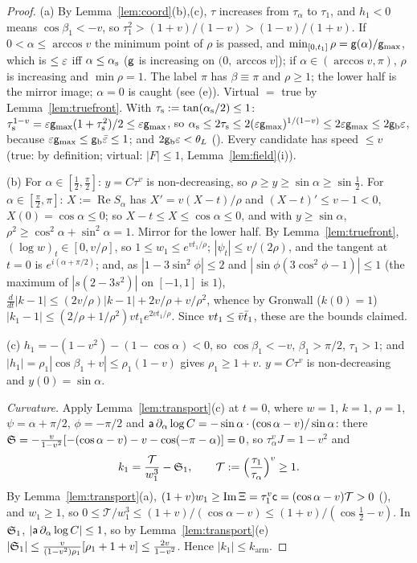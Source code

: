 \begin{proof}
(a) By Lemma~\ref{lem:coord}(b),(c), $\tau$ increases from $\tau_\alpha$ to $\tau_1$, and $h_1<0$ means $\cos\beta_1<-v$, so
$\tau_1^2>(1+v)/(1-v)>(1-v)/(1+v)$. If $0<\alpha\le\arccos v$ the minimum point of $\rho$ is passed, and
$\min_{[0,t_1]}\rho=\mathsf g(\alpha)/\mathsf g_{\max}$, which is $\le\varepsilon$ iff $\alpha\le\alpha_{\mathrm s}$ ($\mathsf g$ is increasing on $(0,\arccos v]$); if
$\alpha\in(\arccos v,\pi)$, $\rho$ is increasing and $\min\rho=1$. The label $\pi$ has $\beta\equiv\pi$ and $\rho\ge1$; the lower half is
the mirror image; $\alpha=0$ is caught (see (e)). Virtual $=$ true by Lemma~\ref{lem:truefront}. With $\tau_{\mathrm s}:=\tan(\alpha_{\mathrm s}/2)\le1$:
$\tau_{\mathrm s}^{1-v}=\varepsilon\mathsf g_{\max}(1+\tau_{\mathrm s}^2)/2\le\varepsilon\mathsf g_{\max}$, so $\alpha_{\mathrm s}\le2\tau_{\mathrm s}\le2(\varepsilon\mathsf g_{\max})^{1/(1-v)}\le2\varepsilon\mathsf g_{\max}\le2\mathsf g_{\mathrm b}\varepsilon$,
because $\varepsilon\mathsf g_{\max}\le\mathsf g_{\mathrm b}\bar\varepsilon\le1$; and $2\mathsf g_{\mathrm b}\varepsilon<\theta_L$ (). Every candidate has speed $\le v$ (true: by definition;
virtual: $|F|\le1$, Lemma~\ref{lem:field}(i)).

(b) For $\alpha\in[\frac12,\frac\pi2]$: $y=C\tau^v$ is non-decreasing, so $\rho\ge y\ge\sin\alpha\ge\sin\frac12$. For
$\alpha\in[\frac\pi2,\pi]$: $X:=\operatorname{Re}S_\alpha$ has $X'=v(X-t)/\rho$ and $(X-t)'\le v-1<0$, $X(0)=\cos\alpha\le0$; so $X-t\le X\le\cos\alpha\le0$,
and with $y\ge\sin\alpha$, $\rho^2\ge\cos^2\alpha+\sin^2\alpha=1$. Mirror for the lower half. By Lemma~\ref{lem:truefront}, $(\log w)_t\in[0,v/\rho]$,
so $1\le w_1\le e^{vt_1/\rho}$; $|\psi_t|\le v/(2\rho)$, and the tangent at $t=0$ is $e^{i(\alpha+\pi/2)}$; and, as
$|1-3\sin^2\!\phi|\le2$ and $|\sin\phi(3\cos^2\!\phi-1)|\le1$ (the maximum of $|s(2-3s^2)|$ on $[-1,1]$ is $1$),
$\frac d{dt}|k-1|\le(2v/\rho)|k-1|+2v/\rho+v/\rho^2$, whence by Gronwall ($k(0)=1$) $|k_1-1|\le(2/\rho+1/\rho^2)vt_1e^{2vt_1/\rho}$. Since
$vt_1\le\bar v\bar t_1$, these are the bounds claimed.

(c) $h_1=-(1-v^2)-(1-\cos\alpha)<0$, so $\cos\beta_1<-v$, $\beta_1>\pi/2$, $\tau_1>1$; and $|h_1|=\rho_1|\cos\beta_1+v|\le\rho_1(1-v)$ gives
$\rho_1\ge1+v$. $y=C\tau^v$ is non-decreasing and $y(0)=\sin\alpha$.

\emph{Curvature.} Apply Lemma~\ref{lem:transport}(c) at $t=0$, where $w=1$, $k=1$, $\rho=1$, $\psi=\alpha+\pi/2$, $\phi=-\pi/2$ and
$\mathsf a\,\partial_\alpha\log C=-\sin\alpha\cdot(\cos\alpha-v)/\sin\alpha$: there
$\mathfrak S=-\frac v{1-v^2}[-(\cos\alpha-v)-v-\cos(-\pi-\alpha)]=0$, so $\tau_\alpha^vJ=1-v^2$ and
\[
k_1=\frac{\mathcal T}{w_1^3}-\mathfrak S_1,\qquad\mathcal T:=\Bigl(\frac{\tau_1}{\tau_\alpha}\Bigr)^v\ge1 .
\]
By Lemma~\ref{lem:transport}(a), $(1+v)w_1\ge\operatorname{Im}\Xi=\tau_1^v\mathsf c=(\cos\alpha-v)\mathcal T>0$ (), and $w_1\ge1$, so
$0\le\mathcal T/w_1^3\le(1+v)/(\cos\alpha-v)\le(1+v)/(\cos\frac12-v)$. In $\mathfrak S_1$, $|\mathsf a\,\partial_\alpha\log C|\le1$, so by
Lemma~\ref{lem:transport}(e) $|\mathfrak S_1|\le\frac v{(1-v^2)\rho_1}[\rho_1+1+v]\le\frac{2v}{1-v^2}$. Hence $|k_1|\le k_{\mathrm{arm}}$.


\end{proof}
